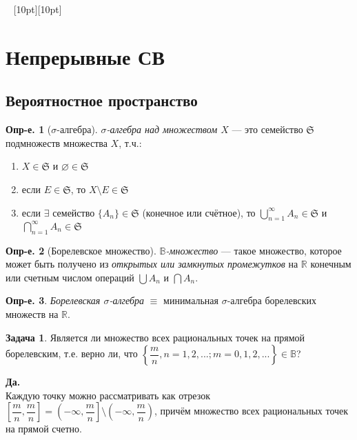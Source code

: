 \documentclass[a4paper,12pt,fleqn]{article}
\newenvironment{onsamepage} {\begin{minipage}{\textwidth}} {\end{minipage}}
\numberwithin{figure}{section}
\theoremstyle{definition}
\newtheorem{definition}{Опр-е.}[section]
\newtheorem{problem}{Задача}[section]
\let\DS\displaystyle
\def\B{\mathbb{B}}
\def\R{\mathbb{R}}
\def\S{\mathfrak{S}}
\def\mbyn{\dfrac{m}{n}}
\def\vignette{\vspace{48pt} \noindent \hrulefill~
	          \raisebox{-8pt}[10pt][10pt]{\Huge\ding{102}}
	          ~\hrulefill}
\begin{document}
\vignette
\section{Непрерывные СВ}


\subsection{Вероятностное пространство}

\begin{onsamepage}
\begin{definition}[$\sigma$-алгебра]
\textit{$\sigma$-алгебра над множеством $X$}
--- это семейство $\S$ подмножеств множества $X$, т.ч.:
\begin{enumerate}
	\item $X \in \S$ и $\varnothing \in \S$
	\item если $E \in \S$, то $X \setminus E \in \S$
	\item если $\exists$ семейство $\{A_n\} \in \S$ (конечное или счётное),
	      то $\DS \bigcup_{n=1}^{\infty} A_n \in \S$
	      и $\DS \bigcap_{n=1}^{\infty} A_n \in \S$
\end{enumerate}
\end{definition}
\end{onsamepage}

\begin{definition}[Борелевское множество]
	\textit{$\B$-множество} --- такое множество, которое может быть
	получено из \textit{открытых или замкнутых промежутков} на $\R$
	конечным или счетным числом операций $\bigcup A_n$ и $\bigcap A_n$.
\end{definition}

\begin{definition}
	\textit{Борелевская $\sigma$-алгебра} $\equiv$ минимальная
	$\sigma$-алгебра борелевских множеств на $\R$.
\end{definition}


\medskip
\begin{problem}
	Является ли множество всех рациональных точек на прямой борелевским,
	т.е. верно ли, что
	$\left\{ \mbyn, n=1,2,...; m=0,1,2,... \right\} \in \B$?
\end{problem}
\begin{solution}
	{\bfseries Да.}\\
	Каждую точку можно рассматривать как отрезок
	$\left[ \mbyn,\mbyn \right] =
	\left( -\infty, \mbyn \right] \setminus \left( -\infty, \mbyn \right)$,
	причём множество всех рациональных точек на прямой счетно.
\end{solution}
\end{document}
